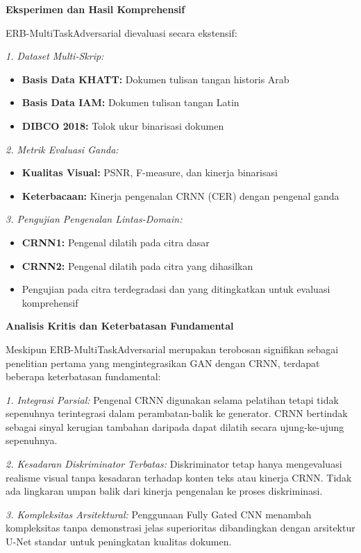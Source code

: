 \documentclass[12pt,a4paper]{article}
\begin{document}
\textbf{Eksperimen dan Hasil Komprehensif}

ERB-MultiTaskAdversarial dievaluasi secara ekstensif:

\textit{1. Dataset Multi-Skrip:}
\begin{itemize}
    \item \textbf{Basis Data KHATT:} Dokumen tulisan tangan historis Arab
    \item \textbf{Basis Data IAM:} Dokumen tulisan tangan Latin
    \item \textbf{DIBCO 2018:} Tolok ukur binarisasi dokumen
\end{itemize}

\textit{2. Metrik Evaluasi Ganda:}
\begin{itemize}
    \item \textbf{Kualitas Visual:} PSNR, F-measure, dan kinerja binarisasi
    \item \textbf{Keterbacaan:} Kinerja pengenalan CRNN (CER) dengan pengenal ganda
\end{itemize}

\textit{3. Pengujian Pengenalan Lintas-Domain:}
\begin{itemize}
    \item \textbf{CRNN1:} Pengenal dilatih pada citra dasar
    \item \textbf{CRNN2:} Pengenal dilatih pada citra yang dihasilkan
    \item Pengujian pada citra terdegradasi dan yang ditingkatkan untuk evaluasi komprehensif
\end{itemize}

\textbf{Analisis Kritis dan Keterbatasan Fundamental}

Meskipun ERB-MultiTaskAdversarial merupakan terobosan signifikan sebagai penelitian pertama yang mengintegrasikan GAN dengan CRNN, terdapat beberapa keterbatasan fundamental:

\textit{1. Integrasi Parsial:}
Pengenal CRNN digunakan selama pelatihan tetapi tidak sepenuhnya terintegrasi dalam perambatan-balik ke generator. CRNN bertindak sebagai sinyal kerugian tambahan daripada dapat dilatih secara ujung-ke-ujung sepenuhnya.

\textit{2. Kesadaran Diskriminator Terbatas:}
Diskriminator tetap hanya mengevaluasi realisme visual tanpa kesadaran terhadap konten teks atau kinerja CRNN. Tidak ada lingkaran umpan balik dari kinerja pengenalan ke proses diskriminasi.

\textit{3. Kompleksitas Arsitektural:}
Penggunaan Fully Gated CNN menambah kompleksitas tanpa demonstrasi jelas superioritas dibandingkan dengan arsitektur U-Net standar untuk peningkatan kualitas dokumen.
\end{document}
